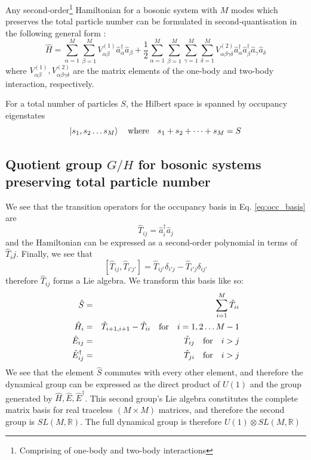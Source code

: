 \documentclass[12pt]{article}
\begin{document}
	Any second-order\footnote{Comprising of one-body and two-body interactions} Hamiltonian for a bosonic system with $M$ modes which preserves the total particle number can be formulated in second-quantisation in the following general form \cite[p. 3]{green}:
	\begin{equation}\label{eq:general hamiltonian}
	\hat{H} = \sum_{\alpha=1}^M\sum_{\beta=1}^M V^{(1)}_{\alpha\beta}\hat{a}^\dagger_\alpha\hat{a}_\beta + \frac{1}{2}\sum_{\alpha=1}^M\sum_{\beta=1}^M\sum_{\gamma=1}^M\sum_{\delta=1}^M V^{(2)}_{\alpha\beta\gamma\delta}\hat{a}^\dagger_\alpha\hat{a}^\dagger_\beta\hat{a}_\gamma\hat{a}_\delta
	\end{equation}
	where $V^{(1)}_{\alpha\beta}, V^{(2)}_{\alpha\beta\gamma\delta}$ are the matrix elements of the one-body and two-body interaction, respectively.
	
	For a total number of particles $S$, the Hilbert space is spanned by occupancy eigenstates
	\begin{equation}\label{eq:occ_basis}
	\ket{s_1,s_2\dots s_M}\qq{where} s_1+s_2+\dots + s_M = S
	\end{equation}
	
	\subsection{Quotient group $G/H$ for bosonic systems preserving total particle number}
	
	We see that the transition operators for the occupancy basis in Eq. \ref{eq:occ_basis} are
	\begin{equation}
		\hat{T}_{ij}=\hat{a}^\dagger_i\hat{a}_j
	\end{equation}
	and the Hamiltonian can be expressed as a second-order polynomial in terms of $\hat{T}_ij$. Finally, we see that
	\begin{equation}
	\left[\hat{T}_{ij}, \hat{T}_{i'j'}\right]=\hat{T}_{ij'}\delta_{i'j}-\hat{T}_{i'j}\delta_{ij'}
	\end{equation}
	therefore $\hat{T}_{ij}$ forms a Lie algebra. We transform this basis like so:
	\begin{eqnarray*}
	\hat{S}&=&\sum_{i=1}^M\hat{T}_{ii}\\
	\hat{H}_i&=&\hat{T}_{i+1,i+1}-\hat{T}_{ii}\qq{for}i=1,2\dots M-1\\
	\hat{E}_{ij}&=&\hat{T}_{ij}\qq{for}i>j\\
	\hat{E}_{ij}^\dagger &=&\hat{T}_{ji}\qq{for}i>j
	\end{eqnarray*}
	We see that the element $\hat{S}$ commutes with every other element, and therefore the dynamical group can be expressed as the direct product of $U(1)$ and the group generated by $\hat{H},\hat{E},\hat{E}^\dagger$. This second group's Lie algebra constitutes the complete matrix basis for real traceless $(M\times M)$ matrices, and therefore the second group is $SL(M,\mathbb{R})$. The full dynamical group is therefore $U(1)\otimes SL(M,\mathbb{R})$
	
\end{document}
